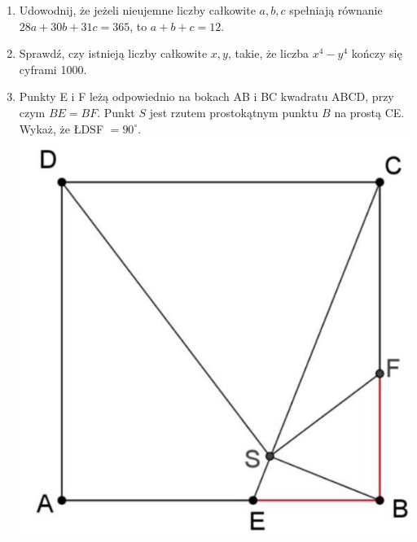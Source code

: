 \documentclass[10pt]{article}
\begin{document}
\begin{enumerate}
  \item Udowodnij, że jeżeli nieujemne liczby całkowite \(a, b, c\) spełniają równanie \(28 a+30 b+31 c=365\), to \(a+b+c=12\).
  \item Sprawdź, czy istnieją liczby całkowite \(x, y\), takie, że liczba \(x^{4}-y^{4}\) kończy się cyframi 1000.
  \item Punkty E i F leżą odpowiednio na bokach AB i BC kwadratu ABCD, przy czym \(B E=B F\). Punkt \(S\) jest rzutem prostokątnym punktu \(B\) na prostą CE. Wykaż, że ŁDSF \(=90^{\circ}\).\\
\includegraphics[max width=\textwidth, center]{2024_11_21_0730e5d305676e2c9de1g-1}
\end{enumerate}
\end{document}
